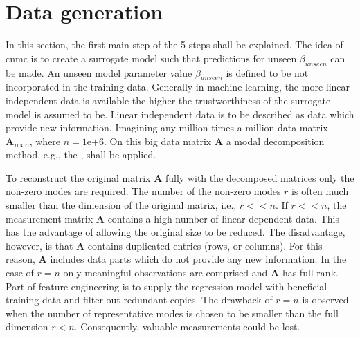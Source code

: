 \section{Data generation}
\label{sec_2_2_Data_Gen}
In this section, the first main step of the 5 steps shall be explained.
The idea of \gls{cnmc} is to create a surrogate model such that predictions for unseen $\beta_{unseen}$ can be made. 
An unseen model parameter value $\beta_{unseen}$ is defined to be not incorporated in the training data. Generally in machine learning, the more linear independent data is available the higher the trustworthiness of the surrogate model is assumed to be.
Linear independent data is to be described as data which provide new information. 
Imagining any million times a million data matrix $\bm {A_{n\, x\, n}}$, where  $n = 1 \mathrm{e}{+6}$. 
On this big data matrix $\bm A$  a modal decomposition method, e.g., the  \cite{Brunton2019,gerbrands1981relationships}, shall be applied.\newline 

To reconstruct the original matrix $\bm A$ fully with the decomposed matrices only the non-zero modes are required. The number of the non-zero modes $r$ is often much smaller than the dimension of the original matrix, i.e., $r << n$.
If $r << n$, the measurement matrix $\bm A$ contains a high number of linear dependent data. This has the advantage of allowing the original size to be reduced. The disadvantage, however, is that $\bm A$ contains duplicated entries (rows, or columns). For this reason, $\bm A$ includes data parts which do not provide any new information. 
In the case of $r = n$ only meaningful observations are comprised and $\bm A$ has full rank. 
Part of feature engineering is to supply the regression model with beneficial training data and filter out redundant copies. 
The drawback of $r = n$ is observed when the number of representative modes is chosen to be smaller than the full dimension $r < n$. 
Consequently, valuable measurements could be lost. \newline


